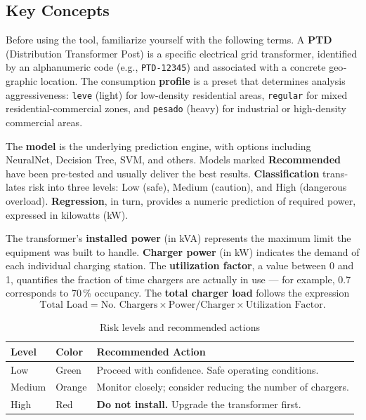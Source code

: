 \documentclass[11pt,a4paper,openany]{book}
\begin{document}
\begin{otherlanguage}{english}

\chapter{Key Concepts}\label{ch:concepts}

Before using the tool, familiarize yourself with the following terms. A \textbf{PTD} (Distribution Transformer Post) is a specific electrical grid transformer, identified by an alphanumeric code (e.g., \texttt{PTD-12345}) and associated with a concrete geographic location. The consumption \textbf{profile} is a preset that determines analysis aggressiveness: \texttt{leve} (light) for low-density residential areas, \texttt{regular} for mixed residential-commercial zones, and \texttt{pesado} (heavy) for industrial or high-density commercial areas.

The \textbf{model} is the underlying prediction engine, with options including NeuralNet, Decision Tree, SVM, and others. Models marked \textbf{Recommended} have been pre-tested and usually deliver the best results. \textbf{Classification} translates risk into three levels: Low (safe), Medium (caution), and High (dangerous overload). \textbf{Regression}, in turn, provides a numeric prediction of required power, expressed in kilowatts (kW).

The transformer's \textbf{installed power} (in kVA) represents the maximum limit the equipment was built to handle. \textbf{Charger power} (in kW) indicates the demand of each individual charging station. The \textbf{utilization factor}, a value between 0 and 1, quantifies the fraction of time chargers are actually in use --- for example, 0.7 corresponds to 70\,\% occupancy. The \textbf{total charger load} follows the expression
\[
\text{Total Load} = \text{No. Chargers} \times \text{Power/Charger} \times \text{Utilization Factor}.
\]

\begin{table}[H]
\centering
\caption{Risk levels and recommended actions}\label{tab:risks-en}
\begin{tabular}{@{}llp{6cm}@{}}
\toprule
\textbf{Level} & \textbf{Color} & \textbf{Recommended Action} \\
\midrule
Low & Green & Proceed with confidence. Safe operating conditions. \\
Medium & Orange & Monitor closely; consider reducing the number of chargers. \\
High & Red & \textbf{Do not install.} Upgrade the transformer first. \\
\bottomrule
\end{tabular}
\end{table}


\end{otherlanguage}
\end{document}
